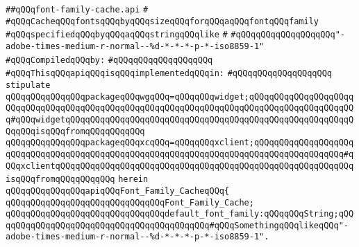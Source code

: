 \label{src/lib/x-kit/widget/old/fancy/graphviz/font-family-cache.api}
\verb|##qQQqfont-family-cache.api|\newline
\verb|#|\newline
\verb|#qQQqCacheqQQqfontsqQQqbyqQQqsizeqQQqforqQQqaqQQqfontqQQqfamily|\newline
\verb|#qQQqspecifiedqQQqbyqQQqaqQQqstringqQQqlike|\newline
\verb|#|\newline
\verb|#qQQqqQQqqQQqqQQqqQQq"-adobe-times-medium-r-normal--%d-*-*-*-p-*-iso8859-1"|\newline
\newline
\verb|#qQQqCompiledqQQqby:|\newline
\verb|#qQQqqQQqqQQqqQQqqQQq|\newline
\newline
\verb|#qQQqThisqQQqapiqQQqisqQQqimplementedqQQqin:|\newline
\verb|#qQQqqQQqqQQqqQQqqQQq|\newline
\newline
\verb|stipulate|\newline
\verb|qQQqqQQqqQQqqQQqpackageqQQqwgqQQq=qQQqqQQqwidget;qQQqqQQqqQQqqQQqqQQqqQQqqQQqqQQqqQQqqQQqqQQqqQQqqQQqqQQqqQQqqQQqqQQqqQQqqQQqqQQqqQQqqQQqqQQq#qQQqwidgetqQQqqQQqqQQqqQQqqQQqqQQqqQQqqQQqqQQqqQQqqQQqqQQqqQQqqQQqqQQqqQQqisqQQqfromqQQqqQQqqQQq|\newline
\verb|qQQqqQQqqQQqqQQqpackageqQQqxcqQQq=qQQqqQQqxclient;qQQqqQQqqQQqqQQqqQQqqQQqqQQqqQQqqQQqqQQqqQQqqQQqqQQqqQQqqQQqqQQqqQQqqQQqqQQqqQQqqQQqqQQq#qQQqxclientqQQqqQQqqQQqqQQqqQQqqQQqqQQqqQQqqQQqqQQqqQQqqQQqqQQqqQQqqQQqisqQQqfromqQQqqQQqqQQq|\newline
\verb|herein|\newline
\newline
\verb|qQQqqQQqqQQqqQQqapiqQQqFont_Family_CacheqQQq{|\newline
\newline
\verb|qQQqqQQqqQQqqQQqqQQqqQQqqQQqqQQqFont_Family_Cache;|\newline
\newline
\verb|qQQqqQQqqQQqqQQqqQQqqQQqqQQqqQQqdefault_font_family:qQQqqQQqString;qQQqqQQqqQQqqQQqqQQqqQQqqQQqqQQqqQQqqQQqqQQq#qQQqSomethingqQQqlikeqQQq"-adobe-times-medium-r-normal--%d-*-*-*-p-*-iso8859-1".|\newline
